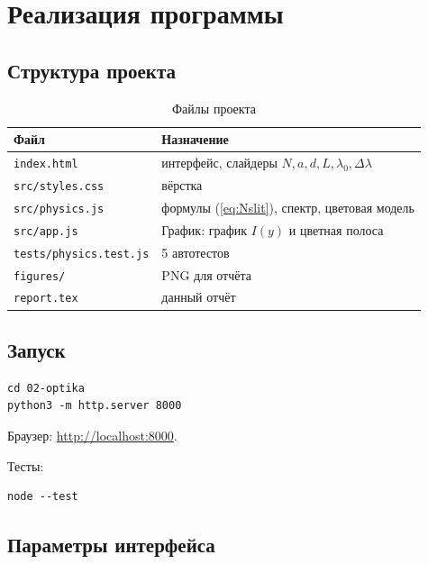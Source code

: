 \documentclass[12pt,a4paper]{article}
\begin{document}
\section{Реализация программы}

\subsection{Структура проекта}

\begin{table}[H]
\centering
\caption{Файлы проекта}
\begin{tabular}{@{}ll@{}}
\toprule
Файл & Назначение \\
\midrule
\texttt{index.html} & интерфейс, слайдеры \(N,a,d,L,\lambda_0,\Delta\lambda\) \\
\texttt{src/styles.css} & вёрстка \\
\texttt{src/physics.js} & формулы (\ref{eq:Nslit}), спектр, цветовая модель \\
\texttt{src/app.js} & График: график \(I(y)\) и цветная полоса \\
\texttt{tests/physics.test.js} & 5 автотестов \\
\texttt{figures/} & PNG для отчёта \\
\texttt{report.tex} & данный отчёт \\
\bottomrule
\end{tabular}
\end{table}

\subsection{Запуск}

\begin{lstlisting}
cd 02-optika
python3 -m http.server 8000
\end{lstlisting}
Браузер: \url{http://localhost:8000}.

Тесты:
\begin{lstlisting}
node --test
\end{lstlisting}

\subsection{Параметры интерфейса}
\end{document}
